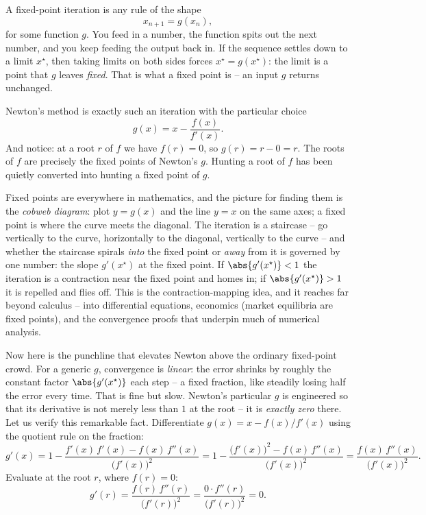 A fixed-point iteration is any rule of the shape
\[
  x_{n+1} = g(x_n),
\]
for some function $g$. You feed in a number, the function spits out the next number,
and you keep feeding the output back in. If the sequence settles down to a limit
$x^\star$, then taking limits on both sides forces $x^\star = g(x^\star)$: the limit
is a point that $g$ leaves \emph{fixed}. That is what a fixed point is -- an input
$g$ returns unchanged.

Newton's method is exactly such an iteration with the particular choice
\[
  g(x) = x - \frac{f(x)}{f'(x)}.
\]
And notice: at a root $r$ of $f$ we have $f(r) = 0$, so $g(r) = r - 0 = r$. The
roots of $f$ are precisely the fixed points of Newton's $g$. Hunting a root of $f$
has been quietly converted into hunting a fixed point of $g$.

\begin{connectionbox}
Fixed points are everywhere in mathematics, and the picture for finding them is the
\emph{cobweb diagram}: plot $y = g(x)$ and the line $y = x$ on the same axes; a
fixed point is where the curve meets the diagonal. The iteration is a staircase --
go vertically to the curve, horizontally to the diagonal, vertically to the curve --
and whether the staircase spirals \emph{into} the fixed point or \emph{away} from it
is governed by one number: the slope $g'(x^\star)$ at the fixed point. If
$\abs{g'(x^\star)} < 1$ the iteration is a contraction near the fixed point and
homes in; if $\abs{g'(x^\star)} > 1$ it is repelled and flies off. This is the
contraction-mapping idea, and it reaches far beyond calculus -- into differential
equations, economics (market equilibria are fixed points), and the convergence
proofs that underpin much of numerical analysis.
\end{connectionbox}

Now here is the punchline that elevates Newton above the ordinary fixed-point
crowd. For a generic $g$, convergence is \emph{linear}: the error shrinks by roughly
the constant factor $\abs{g'(x^\star)}$ each step -- a fixed fraction, like steadily
losing half the error every time. That is fine but slow. Newton's particular $g$ is
engineered so that its derivative is not merely less than $1$ at the root -- it is
\emph{exactly zero} there. Let us verify this remarkable fact. Differentiate
$g(x) = x - f(x)/f'(x)$ using the quotient rule on the fraction:
\[
  g'(x) = 1 - \frac{f'(x)\,f'(x) - f(x)\,f''(x)}{\bigl(f'(x)\bigr)^2}
        = 1 - \frac{\bigl(f'(x)\bigr)^2 - f(x)\,f''(x)}{\bigl(f'(x)\bigr)^2}
        = \frac{f(x)\,f''(x)}{\bigl(f'(x)\bigr)^2}.
\]
Evaluate at the root $r$, where $f(r) = 0$:
\[
  g'(r) = \frac{f(r)\,f''(r)}{\bigl(f'(r)\bigr)^2} = \frac{0 \cdot f''(r)}{\bigl(f'(r)\bigr)^2} = 0.
\]

